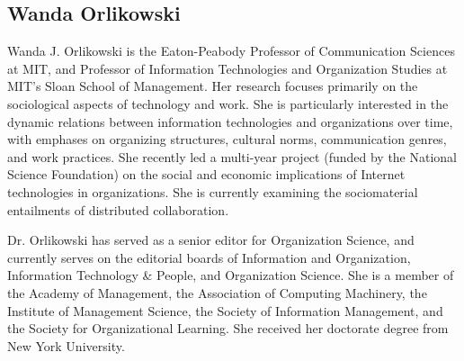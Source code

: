 \documentclass{tufte-handout}
\begin{document}
\subsection{Wanda Orlikowski}

Wanda J. Orlikowski is the Eaton-Peabody Professor of Communication Sciences at MIT, and Professor of Information Technologies and Organization Studies at MIT's Sloan School of Management. Her research focuses primarily on the sociological aspects of technology and work. She is particularly interested in the dynamic relations between information technologies and organizations over time, with emphases on organizing structures, cultural norms, communication genres, and work practices. She recently led a multi-year project (funded by the National Science Foundation) on the social and economic implications of Internet technologies in organizations. She is currently examining the sociomaterial entailments of distributed collaboration.

Dr. Orlikowski has served as a senior editor for Organization Science, and currently serves on the editorial boards of Information and Organization, Information Technology \& People, and Organization Science. She is a member of the Academy of Management, the Association of Computing Machinery, the Institute of Management Science, the Society of Information Management, and the Society for Organizational Learning. She received her doctorate degree from New York University.







\end{document}
